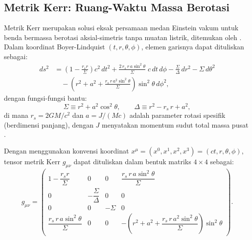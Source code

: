 \subsection{Metrik Kerr: Ruang-Waktu Massa Berotasi}
\label{subsec:metrik-kerr}

Metrik Kerr merupakan solusi eksak persamaan medan Einstein vakum untuk benda bermassa berotasi aksial-simetris tanpa muatan listrik, ditemukan oleh \textcite{Kerr1963KerrMetric}. Dalam koordinat Boyer-Lindquist $(t, r, \theta, \phi)$, elemen garisnya dapat dituliskan sebagai:
\begin{equation}
\begin{split}
    ds^2 &= \left(1 - \frac{r_s r}{\Sigma}\right) c^2\,dt^2
          + \frac{2\,r_s\, r\, a \sin^2\!\theta}{\Sigma}\; c\,dt\,d\phi
          - \frac{\Sigma}{\Delta}\, dr^2
          - \Sigma\, d\theta^2 \\
         &\quad - \left(r^2 + a^2 + \frac{r_s\, r\, a^2 \sin^2\!\theta}{\Sigma}\right)
           \sin^2\!\theta\, d\phi^2,
\end{split}
    \label{eq:kerr-line}
\end{equation}
dengan fungsi-fungsi bantu:
\begin{equation}
    \Sigma \equiv r^2 + a^2 \cos^2\!\theta, \qquad
    \Delta \equiv r^2 - r_s\, r + a^2,
    \label{eq:sigma-delta}
\end{equation}
di mana $r_s = 2GM/c^2$ dan $a = J/(Mc)$ adalah parameter rotasi spesifik (berdimensi panjang), dengan $J$ menyatakan momentum sudut total massa pusat \parencite{Kerr1963KerrMetric, Carroll2004SpacetimeGeometry}.

Dengan menggunakan konvensi koordinat $x^\mu = (x^0, x^1, x^2, x^3) = (ct, r, \theta, \phi)$, tensor metrik Kerr $g_{\mu\nu}$ dapat dituliskan dalam bentuk matriks $4 \times 4$ sebagai:
\begin{equation}
    g_{\mu\nu} =
    \begin{pmatrix}
        1 - \dfrac{r_s r}{\Sigma} & 0 & 0 & \dfrac{r_s\, r\, a \sin^2\!\theta}{\Sigma} \\[12pt]
        0 & -\dfrac{\Sigma}{\Delta} & 0 & 0 \\[12pt]
        0 & 0 & -\Sigma & 0 \\[12pt]
        \dfrac{r_s\, r\, a \sin^2\!\theta}{\Sigma} & 0 & 0
        & -\!\left(r^2 + a^2 + \dfrac{r_s\, r\, a^2 \sin^2\!\theta}{\Sigma}\right)\sin^2\!\theta
    \end{pmatrix}.
    \label{eq:kerr-matrix}
\end{equation}

